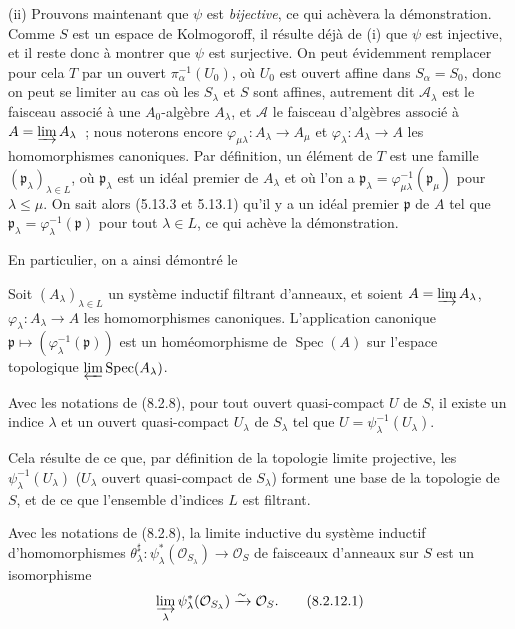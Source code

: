 \medskip
\noindent
(ii) Prouvons maintenant que $\psi$ est \emph{bijective}, ce qui achèvera la
démonstration. Comme $S$ est un espace de Kolmogoroff, il résulte déjà de (i)
que $\psi$ est injective, et il reste donc à montrer que $\psi$ est
surjective. On peut évidemment remplacer pour cela $T$ par un ouvert
$\pi_\alpha^{-1}(U_0)$, où $U_0$ est ouvert affine dans $S_\alpha=S_0$, donc
on peut se limiter au cas où les $S_\lambda$ et $S$ sont affines, autrement
dit $\mathscr A_\lambda$ est le faisceau associé à une $A_0$-algèbre
$A_\lambda$, et $\mathscr A$ le faisceau d'algèbres associé à
$A=\varinjlim A_\lambda$~; nous noterons encore
$\varphi_{\mu\lambda}:A_\lambda\to A_\mu$ et
$\varphi_\lambda:A_\lambda\to A$ les homomorphismes canoniques. Par
définition, un élément de $T$ est une famille
$(\mathfrak p_\lambda)_{\lambda\in L}$, où $\mathfrak p_\lambda$ est un
idéal premier de $A_\lambda$ et où l'on a
$\mathfrak p_\lambda=\varphi_{\mu\lambda}^{-1}(\mathfrak p_\mu)$ pour
$\lambda\leq\mu$. On sait alors (5.13.3 et 5.13.1) qu'il y a un idéal premier
$\mathfrak p$ de $A$ tel que
$\mathfrak p_\lambda=\varphi_\lambda^{-1}(\mathfrak p)$ pour tout
$\lambda\in L$, ce qui achève la démonstration.

En particulier, on a ainsi démontré le

\begin{corollary}[8.2.10]
\label{IV.8.2.10-fr}
Soit $(A_\lambda)_{\lambda\in L}$ un système inductif filtrant d'anneaux, et
soient $A=\varinjlim A_\lambda$, $\varphi_\lambda:A_\lambda\to A$ les
homomorphismes canoniques. L'application canonique
$\mathfrak p\mapsto(\varphi_\lambda^{-1}(\mathfrak p))$ est un
homéomorphisme de $\operatorname{Spec}(A)$ sur l'espace topologique
$\varprojlim\operatorname{Spec}(A_\lambda)$.
\end{corollary}

\begin{corollary}[8.2.11]
Avec les notations de (8.2.8), pour tout ouvert quasi-compact $U$ de $S$, il
existe un indice $\lambda$ et un ouvert quasi-compact $U_\lambda$ de
$S_\lambda$ tel que $U=\psi_\lambda^{-1}(U_\lambda)$.
\end{corollary}

Cela résulte de ce que, par définition de la topologie limite projective, les
$\psi_\lambda^{-1}(U_\lambda)$ ($U_\lambda$ ouvert quasi-compact de
$S_\lambda$) forment une base de la topologie de $S$, et de ce que l'ensemble
d'indices $L$ est filtrant.

\begin{corollary}[8.2.12]
\label{IV.8.2.12-fr}
Avec les notations de (8.2.8), la limite inductive du système inductif
d'homomorphismes
$\theta_\lambda^\sharp:\psi_\lambda^*(\mathcal O_{S_\lambda})\to
\mathcal O_S$ de faisceaux d'anneaux sur $S$ est un isomorphisme
\begin{equation}
\varinjlim_\lambda\psi_\lambda^*(\mathcal O_{S_\lambda})
\xrightarrow{\sim}\mathcal O_S.
\tag{8.2.12.1}\label{IV.8.2.12.1-fr}
\end{equation}
\end{corollary}

